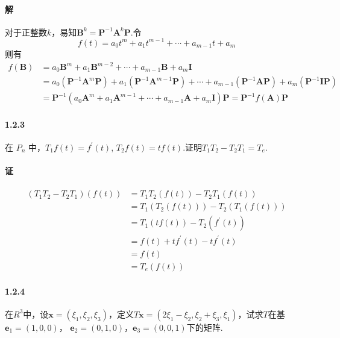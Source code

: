 \documentclass[12pt, a4paper, oneside, fontset=none]{ctexart}
\begin{document}
\paragraph*{解} 对于正整数$k$，易知$\bm{B}^k = \bm{P}^{-1} \bm{A}^k \bm{P}$.令
\[
    f(t) = a_0t^m + a_1t^{m - 1} + \cdots + a_{m - 1} t + a_m
\]
则有
\begin{align*}
    f(\bm{B}) & = a_0 \bm{B}^m + a_1 \bm{B}^{m - 2} + \cdots + a_{m - 1} \bm{B} + a_m \bm{I}                                                                                      \\
              & =  a_0 (\bm{P}^{-1} \bm{A}^m \bm{P}) + a_1 (\bm{P}^{-1} \bm{A}^{m - 1} \bm{P}) + \cdots + a_{m - 1} (\bm{P}^{-1} \bm{A} \bm{P}) + a_m (\bm{P}^{-1} \bm{I} \bm{P}) \\
              & =  \bm{P}^{-1}(a_0  \bm{A}^m + a_1 \bm{A}^{m - 1} + \cdots + a_{m - 1}\bm{A} + a_m \bm{I}) \bm{P} = \bm{P}^{-1} f(\bm{A}) \bm{P}
\end{align*}


{}

\paragraph*{1.2.3} 在 $P_n$ 中，$T_1f(t) = f^{'}(t)$, $T_2f(t) = tf(t)$.证明$T_1T_2 - T_2T_1 = T_e$.

\paragraph*{证}
\begin{align*}
    (T_1T_2 - T_2T_1)(f(t)) & = T_1T_2(f(t)) - T_2T_1(f(t))     \\
                            & = T_1(T_2(f(t))) - T_2(T_1(f(t))) \\
                            & = T_1(tf(t)) - T_2(f^{'}(t))      \\
                            & = f(t) + tf^{'}(t) - tf^{'}(t)    \\
                            & = f(t)                            \\
                            & = T_e(f(t))
\end{align*}

\paragraph*{1.2.4} 在$R^3$中，设$\bm{x} = (\xi_1, \xi_2, \xi_3)$，定义$T\bm{x} = (2\xi_1 - \xi_2, \xi_2 + \xi_3, \xi_1)$，试求$T$在基$\bm{e}_1 = (1, 0, 0)$，
$\bm{e}_2 = (0,1,0)$，$\bm{e}_3 = (0,0,1)$下的矩阵.
\end{document}
